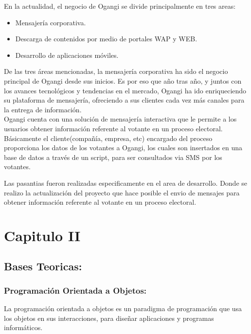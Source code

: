 \documentclass[spanish]{article}
\begin{document}
En la actualidad, el negocio de Ogangi se divide principalmente en tres areas:

\begin{itemize}
	
	\item Mensajería corporativa.	 
	\item Descarga de contenidos por medio de portales WAP y WEB. 	 
	\item Desarrollo de aplicaciones móviles. 	 
\end{itemize}

De las tres áreas mencionadas, la mensajería corporativa ha sido el negocio principal de Ogangi desde sus inicios. Es por eso que año tras año, y juntos con los avances tecnológicos y tendencias en el mercado, Ogangi ha ido enriqueciendo su plataforma de mensajería, ofreciendo a sus clientes cada vez más canales para la entrega de información. \\

Ogangi cuenta con una solución de mensajería interactiva que le permite a los usuarios obtener información referente al votante en un proceso electoral. \\
Básicamente el cliente(compañía, empresa, etc) encargado del proceso proporciona los datos de los votantes a Ogangi, los cuales son insertados en una base de datos a través de un script, para ser consultados via SMS por los votantes.

Las pasantias fueron realizadas especificamente en el area de desarrollo. Donde se realizo la actualización del proyecto que hace posible el envio de mensajes para obtener información referente al votante en un proceso electoral.

\section{Capitulo II}

\subsection{Bases Teoricas:}

\subsubsection{Programación Orientada a Objetos:}

La programación orientada a objetos es un paradigma de programación que usa los objetos en sus interacciones, para diseñar aplicaciones y programas informáticos. \\
\end{document}
